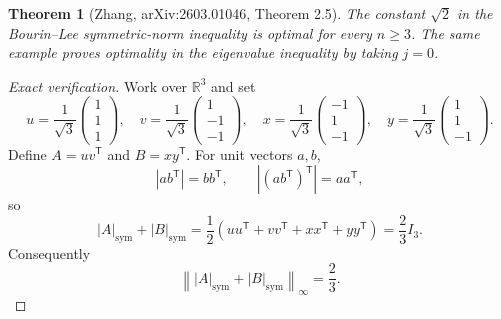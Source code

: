 \documentclass[11pt]{article}
\newtheorem{theorem}{Theorem}
\newcommand{\symmod}[1]{\left|#1\right|_{\mathrm{sym}}}
\newcommand{\opnorm}[1]{\left\lVert#1\right\rVert_{\infty}}
\begin{document}
\begin{theorem}[Zhang, arXiv:2603.01046, Theorem 2.5]
The constant $\sqrt2$ in the Bourin--Lee symmetric-norm inequality is optimal for every $n\geq3$. The same example proves optimality in the eigenvalue inequality by taking $j=0$.
\end{theorem}

\begin{proof}[Exact verification]
Work over $\mathbb R^3$ and set
\[
u=\frac1{\sqrt3}\begin{pmatrix}1\\1\\1\end{pmatrix},\quad
v=\frac1{\sqrt3}\begin{pmatrix}1\\-1\\-1\end{pmatrix},\quad
x=\frac1{\sqrt3}\begin{pmatrix}-1\\1\\-1\end{pmatrix},\quad
y=\frac1{\sqrt3}\begin{pmatrix}1\\1\\-1\end{pmatrix}.
\]
Define $A=uv^{\mathsf T}$ and $B=xy^{\mathsf T}$. For unit vectors $a,b$,
\[
 |ab^{\mathsf T}|=bb^{\mathsf T},\qquad
 |(ab^{\mathsf T})^{\mathsf T}|=aa^{\mathsf T},
\]
so
\[
 \symmod{A}+\symmod{B}
 =\frac12(uu^{\mathsf T}+vv^{\mathsf T}+xx^{\mathsf T}+yy^{\mathsf T})
 =\frac23 I_3.
\]
Consequently
\begin{equation}\label{eq:denominator}
 \opnorm{\symmod{A}+\symmod{B}}=\frac23.
\end{equation}


\end{proof}
\end{document}
